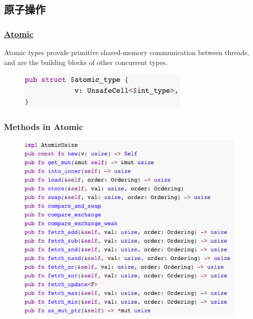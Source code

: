 \subsection{原子操作} %
\begin{frame}[fragile]
    \frametitle{\href{https://doc.rust-lang.org/core/sync/atomic/index.html}{Atomic}}

Atomic types provide primitive shared-memory communication between threads, and are the building blocks of other concurrent types.

    \begin{figure}
    \includegraphics[width=0.5\linewidth]{figs/struct-atomic.png}
    \end{figure}

\end{frame}
% 
% 
% 
% 
% 
\begin{frame}[fragile]
    \frametitle{Methods in Atomic}
    \begin{figure}
    \includegraphics[width=0.55\linewidth]{figs/methods-atomic.png}
    \end{figure}

\end{frame}
